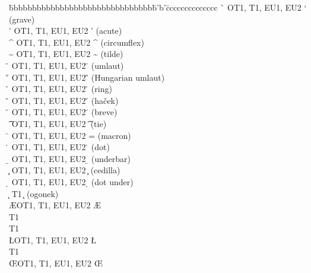 \begin{tabbing}
\ttverb\textvisiblespace\quad\=bbbbbbbbbbbbbbbbbbbbbbbbbbbbbbb\=b'b'\=cccccccccccccc\kill
\ttverb\`{}               \>OT1, T1, EU1, EU2\>   \a`{}\> (grave)      \\
\ttverb\'{}               \>OT1, T1, EU1, EU2\>   \a'{}\> (acute)      \\
\ttverb\^{}               \>OT1, T1, EU1, EU2\>   \^{}\>  (circumflex) \\
\ttverb\~{}               \>OT1, T1, EU1, EU2\>   \~{}\>  (tilde)      \\
\ttverb\"{}               \>OT1, T1, EU1, EU2\>   \"{}\>  (umlaut)     \\
\ttverb\H{}               \>OT1, T1, EU1, EU2\>   \H{}\>  (Hungarian umlaut) \\
\ttverb\r{}               \>OT1, T1, EU1, EU2\>   \r{}\>  (ring)       \\
\ttverb\v{}               \>OT1, T1, EU1, EU2\>   \v{}\>  (ha\v{c}ek)  \\
\ttverb\u{}               \>OT1, T1, EU1, EU2\>   \u{}\>  (breve)      \\
\ttverb\t{}               \>OT1, T1, EU1, EU2\>   \t{}\>  (tie)        \\
\ttverb\={}               \>OT1, T1, EU1, EU2\>   \a={}\> (macron)     \\
\ttverb\.{}               \>OT1, T1, EU1, EU2\>   \.{}\>  (dot)        \\
\ttverb\b{}               \>OT1, T1, EU1, EU2\>   \b{}\>  (underbar)   \\
\ttverb\c{}               \>OT1, T1, EU1, EU2\>   \c{}\>  (cedilla)    \\
\ttverb\d{}               \>OT1, T1, EU1, EU2\>   \d{}\>  (dot under)  \\
\ttverb\k{}               \>T1    \>   \k{}\>  (ogonek)     \\
\ttverb\AE                \>OT1, T1, EU1, EU2\>   \AE \>               \\
\ttverb\DH                \>T1    \>   \DH \>               \\
\ttverb\DJ                \>T1    \>   \DJ \>               \\
\ttverb\L                 \>OT1, T1, EU1, EU2\>   \L  \>               \\
\ttverb\NG                \>T1    \>   \NG \>               \\
\ttverb\OE                \>OT1, T1, EU1, EU2\>   \OE \>               \\

\end{tabbing}
